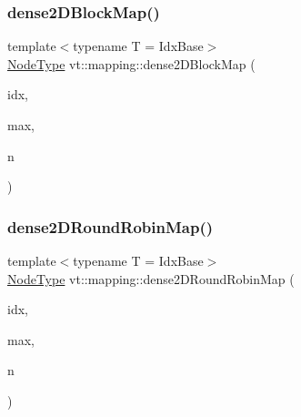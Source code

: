 \mbox{\label{namespacevt_1_1mapping_aca20bcd20c24f4a43e217ca63bf5812c}} 
\subsubsection{\texorpdfstring{dense2\+D\+Block\+Map()}{dense2DBlockMap()}}
{\footnotesize\ttfamily template$<$typename T  = Idx\+Base$>$ \\
\hyperlink{namespacevt_a866da9d0efc19c0a1ce79e9e492f47e2}{Node\+Type} vt\+::mapping\+::dense2\+D\+Block\+Map (\begin{DoxyParamCaption}\item[{\hyperlink{namespacevt_1_1mapping_a6832cbb1361fe72fd7ec730e7b7773b3}{Idx2\+D\+Ptr}$<$ T $>$}]{idx,  }\item[{\hyperlink{namespacevt_1_1mapping_a6832cbb1361fe72fd7ec730e7b7773b3}{Idx2\+D\+Ptr}$<$ T $>$}]{max,  }\item[{\hyperlink{namespacevt_a866da9d0efc19c0a1ce79e9e492f47e2}{Node\+Type}}]{n }\end{DoxyParamCaption})}

\mbox{\label{namespacevt_1_1mapping_ac606a5886c93a4dbb05dfead285c30c6}} 
\subsubsection{\texorpdfstring{dense2\+D\+Round\+Robin\+Map()}{dense2DRoundRobinMap()}}
{\footnotesize\ttfamily template$<$typename T  = Idx\+Base$>$ \\
\hyperlink{namespacevt_a866da9d0efc19c0a1ce79e9e492f47e2}{Node\+Type} vt\+::mapping\+::dense2\+D\+Round\+Robin\+Map (\begin{DoxyParamCaption}\item[{\hyperlink{namespacevt_1_1mapping_a6832cbb1361fe72fd7ec730e7b7773b3}{Idx2\+D\+Ptr}$<$ T $>$}]{idx,  }\item[{\hyperlink{namespacevt_1_1mapping_a6832cbb1361fe72fd7ec730e7b7773b3}{Idx2\+D\+Ptr}$<$ T $>$}]{max,  }\item[{\hyperlink{namespacevt_a866da9d0efc19c0a1ce79e9e492f47e2}{Node\+Type}}]{n }\end{DoxyParamCaption})}

